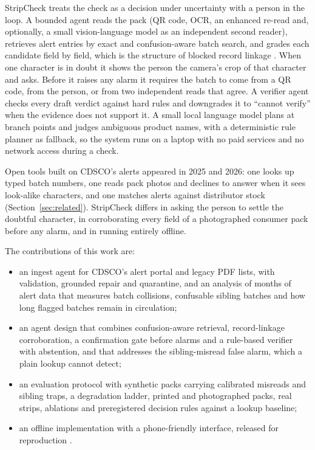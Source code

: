 StripCheck treats the check as a decision under uncertainty with a person in the loop. A bounded agent reads the pack (QR code, OCR, an enhanced re-read and, optionally, a small vision-language model as an independent second reader), retrieves alert entries by exact and confusion-aware batch search, and grades each candidate field by field, which is the structure of blocked record linkage \cite{fellegi1969theory}. When one character is in doubt it shows the person the camera's crop of that character and asks. Before it raises any alarm it requires the batch to come from a QR code, from the person, or from two independent reads that agree. A verifier agent checks every draft verdict against hard rules and downgrades it to ``cannot verify'' when the evidence does not support it. A small local language model plans at branch points and judges ambiguous product names, with a deterministic rule planner as fallback, so the system runs on a laptop with no paid services and no network access during a check.

Open tools built on CDSCO's alerts appeared in 2025 and 2026: one looks up typed batch numbers, one reads pack photos and declines to answer when it sees look-alike characters, and one matches alerts against distributor stock (Section~\ref{sec:related}). StripCheck differs in asking the person to settle the doubtful character, in corroborating every field of a photographed consumer pack before any alarm, and in running entirely offline.

The contributions of this work are:
\begin{itemize}
\item an ingest agent for CDSCO's alert portal and legacy PDF lists, with validation, grounded repair and quarantine, and an analysis of \NumMonths{} months of alert data that measures batch collisions, confusable sibling batches and how long flagged batches remain in circulation;
\item an agent design that combines confusion-aware retrieval, record-linkage corroboration, a confirmation gate before alarms and a rule-based verifier with abstention, and that addresses the sibling-misread false alarm, which a plain lookup cannot detect;
\item an evaluation protocol with synthetic packs carrying calibrated misreads and sibling traps, a degradation ladder, printed and photographed packs, real strips, ablations and preregistered decision rules against a lookup baseline;
\item an offline implementation with a phone-friendly interface, released for reproduction .
\end{itemize}
